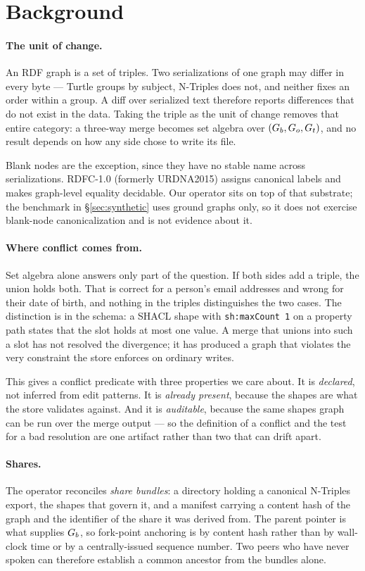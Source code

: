 \section{Background}
\label{sec:background}

\paragraph{The unit of change.} An RDF graph is a set of triples. Two
serializations of one graph may differ in every byte --- Turtle groups by
subject, N-Triples does not, and neither fixes an order within a group. A diff
over serialized text therefore reports differences that do not exist in the
data. Taking the triple as the unit of change removes that entire category:
a three-way merge becomes set algebra over $(G_{b}, G_{o}, G_{t})$, and no
result depends on how any side chose to write its file.

Blank nodes are the exception, since they have no stable name across
serializations. RDFC-1.0 (formerly URDNA2015) assigns canonical labels and makes
graph-level equality decidable. Our operator sits on top of that substrate; the
benchmark in \S\ref{sec:synthetic} uses ground graphs only, so it does not
exercise blank-node canonicalization and is not evidence about it.

\paragraph{Where conflict comes from.} Set algebra alone answers only part of
the question. If both sides add a triple, the union holds both. That is correct
for a person's email addresses and wrong for their date of birth, and nothing in
the triples distinguishes the two cases. The distinction is in the schema: a
SHACL shape with \texttt{sh:maxCount 1} on a property path states that the slot
holds at most one value. A merge that unions into such a slot has not resolved
the divergence; it has produced a graph that violates the very constraint the
store enforces on ordinary writes.

This gives a conflict predicate with three properties we care about. It is
\emph{declared}, not inferred from edit patterns. It is \emph{already present},
because the shapes are what the store validates against. And it is
\emph{auditable}, because the same shapes graph can be run over the merge output
--- so the definition of a conflict and the test for a bad resolution are one
artifact rather than two that can drift apart.

\paragraph{Shares.} The operator reconciles \emph{share bundles}: a directory
holding a canonical N-Triples export, the shapes that govern it, and a manifest
carrying a content hash of the graph and the identifier of the share it was
derived from. The parent pointer is what supplies $G_{b}$, so fork-point
anchoring is by content hash rather than by wall-clock time or by a
centrally-issued sequence number. Two peers who have never spoken can therefore
establish a common ancestor from the bundles alone.
